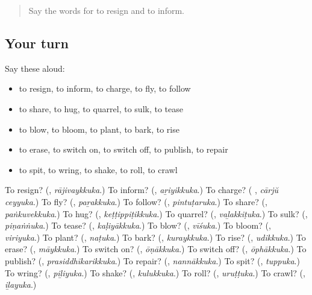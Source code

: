 \label{lesson:ML-R189-second-pass-words-from-chapters-185-189}



\begin{quote}
Say the words for to resign and to inform.
\end{quote}

\subsection*{Your turn}
Say these aloud:

\begin{itemize}
\raggedright
  \item to resign, to inform, to charge, to fly, to follow
  \item to share, to hug, to quarrel, to sulk, to tease
  \item to blow, to bloom, to plant, to bark, to rise
  \item to erase, to switch on, to switch off, to publish, to repair
  \item to spit, to wring, to shake, to roll, to crawl
\end{itemize}

\begin{tcolorbox}[breakable,colback=teal!4,colframe=teal!35!black,title={Before you move on}]
To resign? (\textbf{}, \emph{rājivaykkuka}.) To inform? (\textbf{}, \emph{aṟiyikkuka}.) To charge? (\textbf{ }, \emph{cārjŭ ceyyuka}.) To fly? (\textbf{}, \emph{paṟakkuka}.) To follow? (\textbf{}, \emph{pintuṭaruka}.) To share? (\textbf{}, \emph{paṅkuvekkuka}.) To hug? (\textbf{}, \emph{keṭṭippiṭikkuka}.) To quarrel? (\textbf{}, \emph{vaḻakkiṭuka}.) To sulk? (\textbf{}, \emph{piṇaṅṅuka}.) To tease? (\textbf{}, \emph{kaḷiyākkuka}.) To blow? (\textbf{}, \emph{vīśuka}.) To bloom? (\textbf{}, \emph{viriyuka}.) To plant? (\textbf{}, \emph{naṭuka}.) To bark? (\textbf{}, \emph{kuraykkuka}.) To rise? (\textbf{}, \emph{udikkuka}.) To erase? (\textbf{}, \emph{māykkuka}.) To switch on? (\textbf{}, \emph{ōṇākkuka}.) To switch off? (\textbf{}, \emph{ōphākkuka}.) To publish? (\textbf{}, \emph{prasiddhīkarikkuka}.) To repair? (\textbf{}, \emph{nannākkuka}.) To spit? (\textbf{}, \emph{tuppuka}.) To wring? (\textbf{}, \emph{piḻiyuka}.) To shake? (\textbf{}, \emph{kulukkuka}.) To roll? (\textbf{}, \emph{uruṭṭuka}.) To crawl? (\textbf{}, \emph{iḻayuka}.)
\end{tcolorbox}
